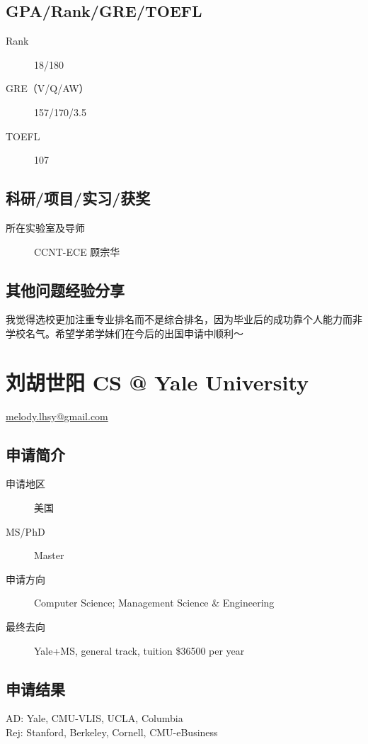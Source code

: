 \documentclass[11pt,fleqn,openany]{book} %
\begin{document}
\subsection*{GPA/Rank/GRE/TOEFL}
\begin{description}
\item[Rank] 18/180
\item[GRE（V/Q/AW）] 157/170/3.5
\item[TOEFL] 107
\end{description}

\subsection*{科研/项目/实习/获奖}
\begin{description}
\item[所在实验室及导师] CCNT-ECE 顾宗华
\end{description}
\subsection*{其他问题经验分享}
我觉得选校更加注重专业排名而不是综合排名，因为毕业后的成功靠个人能力而非学校名气。希望学弟学妹们在今后的出国申请中顺利～
\clearpage
\section{刘胡世阳 CS @ Yale University}
\hfill \href{mailto:melody.lhsy@gmail.com}{melody.lhsy@gmail.com}

\noindent\begin{minipage}[t]{0.45\textwidth}
\subsection*{申请简介}
\begin{description}
\item[申请地区] 美国
\item[MS/PhD] Master
\item[申请方向] Computer Science; Management Science \& Engineering
\item[最终去向] Yale+MS, general track, tuition \$36500 per year
\end{description}
\end{minipage}
\hfill
\begin{minipage}[t]{0.45\textwidth}
\subsection*{申请结果}
\noindent AD: Yale, CMU-VLIS, UCLA, Columbia\\
Rej: Stanford, Berkeley, Cornell, CMU-eBusiness
\end{minipage}
\end{document}
